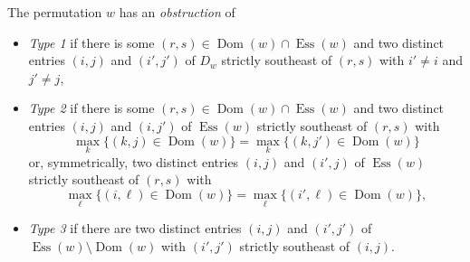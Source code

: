 \documentclass[ALCO,Unicode,published]{cedram}
\DeclareMathOperator{\Ess}{Ess}
\DeclareMathOperator{\Dom}{Dom}
\begin{document}
\begin{definition}
The permutation $w$ has an \emph{obstruction} of \begin{itemize}
\item \emph{Type 1} if there is some $(r,s) \in \Dom(w) \cap \Ess(w)$ and two distinct entries $(i,j)$ and $(i',j')$ of $D_w$ strictly southeast of $(r,s)$ with $i' \neq i$ and $j' \neq j$,
\item \emph{Type 2} if there is some $(r,s) \in \Dom(w) \cap \Ess(w)$ and two distinct entries $(i,j)$ and $(i,j')$ of $\Ess(w)$ strictly southeast of $(r,s)$ with \[
\max_k \{(k,j) \in \Dom(w)\} = \max_k \{(k,j') \in \Dom(w)\}
\] or, symmetrically, two distinct entries $(i,j)$ and $(i',j)$ of $\Ess(w)$ strictly southeast of $(r,s)$ with \[
\max_\ell \{(i,\ell) \in \Dom(w)\} = \max_\ell \{(i',\ell) \in \Dom(w)\},
\]
\item \emph{Type 3} if there are two distinct entries $(i,j)$ and $(i',j')$ of $\Ess(w) \setminus \Dom(w)$ with $(i',j')$ strictly southeast of $(i,j)$.\qedhere
\end{itemize}
\end{definition}
\end{document}
